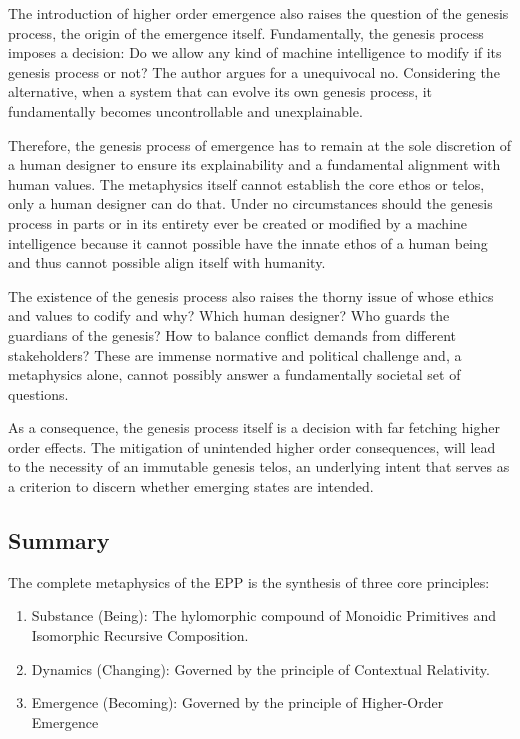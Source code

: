 The introduction of higher order emergence also raises the question of the genesis process, 
the origin of the emergence itself. Fundamentally, the genesis process imposes a decision: Do we allow any kind of machine intelligence to modify if its genesis process or not? The author argues for a unequivocal no. 
Considering the alternative, when a system that can evolve its own genesis process, it fundamentally becomes uncontrollable and unexplainable. 

Therefore, the genesis process of emergence  has to remain at the sole discretion of a human designer to ensure its explainability and a fundamental alignment with human values. The metaphysics itself cannot establish the core ethos or telos, only a human designer can do that. Under no circumstances should the genesis process in parts or in its entirety ever be created or modified by a machine intelligence because it cannot possible have the innate ethos of a human being and thus cannot possible align itself with humanity. 

The existence of the genesis process also raises the thorny issue of whose ethics and values to codify and why? Which human designer? Who guards the guardians of the genesis? How to balance conflict demands from different stakeholders? These are  immense normative and political challenge and, a metaphysics alone, cannot possibly answer a fundamentally societal set of questions. 

As a consequence, the genesis process itself is a decision with far fetching higher order effects. The mitigation of unintended higher order consequences, will lead to the necessity of an immutable genesis telos, an underlying intent that serves as a criterion to discern whether emerging states are intended. 


\subsection{Summary} 
\label{sec:metaphysics_summary}

The complete metaphysics of the EPP is the synthesis of three core principles:

\begin{enumerate}
\item Substance (Being): The hylomorphic compound of Monoidic Primitives and Isomorphic Recursive Composition.
\item Dynamics (Changing): Governed by the principle of Contextual Relativity.
\item Emergence (Becoming): Governed by the principle of Higher-Order Emergence 
\end{enumerate}


